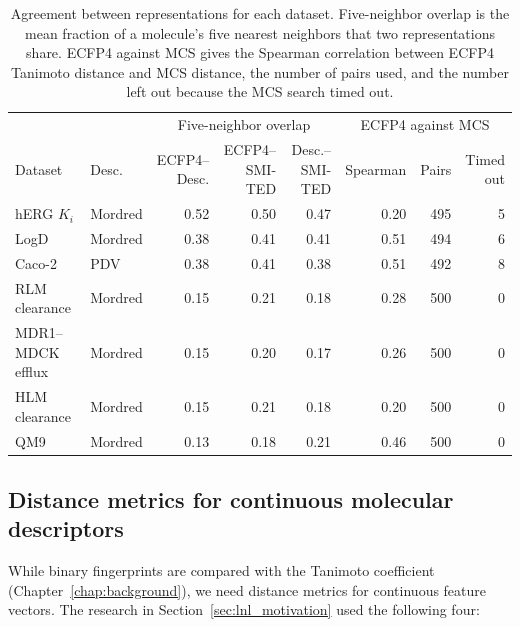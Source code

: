 \begin{table}[t]
\centering
\small
\setlength{\tabcolsep}{4pt}
\begin{adjustbox}{max width=\textwidth,max totalheight=0.78\textheight}
\begin{tabular}{llrrrrrr}
\toprule
 & & \multicolumn{3}{c}{Five-neighbor overlap} & \multicolumn{3}{c}{ECFP4 against MCS} \\
\cmidrule(lr){3-5}\cmidrule(lr){6-8}
Dataset & Desc. & \makecell{ECFP4--\\Desc.} & \makecell{ECFP4--\\SMI-TED} & \makecell{Desc.--\\SMI-TED} & Spearman & Pairs & \makecell{Timed\\out} \\
\midrule
hERG $K_i$ & Mordred & 0.52 & 0.50 & 0.47 & 0.20 & 495 & 5 \\
LogD & Mordred & 0.38 & 0.41 & 0.41 & 0.51 & 494 & 6 \\
Caco-2 & PDV & 0.38 & 0.41 & 0.38 & 0.51 & 492 & 8 \\
RLM clearance & Mordred & 0.15 & 0.21 & 0.18 & 0.28 & 500 & 0 \\
MDR1--MDCK efflux & Mordred & 0.15 & 0.20 & 0.17 & 0.26 & 500 & 0 \\
HLM clearance & Mordred & 0.15 & 0.21 & 0.18 & 0.20 & 500 & 0 \\
QM9 & Mordred & 0.13 & 0.18 & 0.21 & 0.46 & 500 & 0 \\
\bottomrule
\end{tabular}
\end{adjustbox}
\caption[Agreement between representations per dataset.]{Agreement between representations for each dataset. Five-neighbor overlap is the mean fraction of a molecule's five nearest neighbors that two representations share. ECFP4 against MCS gives the Spearman correlation between ECFP4 Tanimoto distance and MCS distance, the number of pairs used, and the number left out because the MCS search timed out.}
\label{tab:flaws:neighbor_overlap}
\end{table}


\subsection{Distance metrics for continuous molecular descriptors}


While binary fingerprints are compared with the Tanimoto coefficient (Chapter~\ref{chap:background}), we need distance metrics for continuous feature vectors. The research in Section~\ref{sec:lnl_motivation} used the following four:

